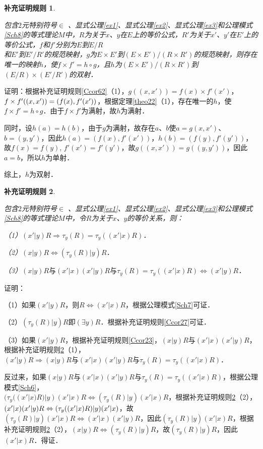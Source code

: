 \documentclass[12pt, a4paper, oneside]{book}
\newtheorem{Ccor}{补充证明规则}
\begin{document}
			\begin{Ccor}\label{Ccor64}
				\hfill\par
				包含$2$元特别符号$\in$ 、显式公理\ref{ex1}、显式公理\ref{ex2}、显式公理\ref{ex3}和公理模式\ref{Sch8}的等式理论$M$中，$R$为关于$x$、$y$在$E$上的等价公式，$R'$为关于$x'$、$y'$在$E'$上的等价公式，$f$和$f'$分别为$E$到$E/R$\\和$E'$到$E'/R'$的规范映射，$g$为$E\times E'$到$(E\times E')/(R\times R')$的规范映射，则存在唯一的映射$h$，使$f\times f'=h\circ g$，且$h$为$(E\times E')/(R\times R')$到$(E/R)\times (E'/R')$的双射．
			\end{Ccor}
			证明：根据补充证明规则\ref{Ccor62}（1），$g((x, x'))=f(x)\times f'(x')$，$f\times f'((x, x'))=\\(f(x), f'(x'))$，根据定理\ref{theo22}（1），存在唯一的$h$，使$f\times f'=h\circ g$．由于$f\times f'$为满射，故$h$为满射．
			\par
			同时，设$h(a)=h(b)$，由于$g$为满射，故存在$a$、$b$使$a=g(x, x')$、$b=(y, y')$，因此$h(a)= (f(x), f'(x'))$，$h(b)=(f(y), f'(y'))$，故$f(x)=f(y)$, $f'(x')=f'(y')$，故$g((x, x'))=g((y, y'))$，因此$a=b$，所以$h$为单射．
			\par
			综上，$h$为双射．
			
			
			\begin{Ccor}\label{Ccor65}
				\hfill\par
				包含$2$元特别符号$\in$ 、显式公理\ref{ex1}、显式公理\ref{ex2}、显式公理\ref{ex3}和公理模式\ref{Sch8}的等式理论$M$中，令$R$为关于$x$、$y$的等价关系，则：
				\par
				（1）$(x'|y)R\Rightarrow \tau_y(R)=\tau_y((x'|x)R)$．
				\par
				（2）$(x|y)R\Leftrightarrow (\tau_y(R)|y)R$．
				\par
				（3）$(x|y)R\text{与}(x'|x)(x'|y)R\text{与}\tau_y(R)=\tau_y((x'|x)R)\Leftrightarrow (x'|y)R$．
			\end{Ccor}
			证明：
			\par
			（1）如果$(x'|y)R$，则$R\Leftrightarrow (x'|x)R$，根据公理模式\ref{Sch7}可证．
			\par
			（2）$(\tau_y(R)|y)R$即$(\exists y)R$．根据补充证明规则\ref{Ccor27}可证．
			\par
			（3）如果$(x'|y)R$，根据补充证明规则\ref{Ccor23}，$(x|y)R\text{与}(x'|x)(x'|y)R$，根据补充证明规则\ref{Ccor65}（1），$(x'|y)R\Rightarrow (x|y)R\text{与}(x'|x)(x'|y)R\text{与}\tau_y(R)=\tau_y((x'|x)R)$．
			\par
			反过来，如果$(x|y)R\text{与}(x'|x)(x'|y)R\text{与}\tau_y(R)=\tau_y((x'|x)R)$，根据公理模式\ref{Sch6}，\\$(\tau_y((x'|x)R)|y)(x'|x)R\Leftrightarrow (\tau_y(R)|y)(x'|x)R$，根据补充证明规则\ref{Ccor65}（2），$(x'|x)(x'|y)R \Leftrightarrow\\ (\tau_y((x'|x)R)|y)(x'|x)$，故$(\tau_y(R)|y)(x'|x)R\Leftrightarrow (x'|x)(x'|y)R$，因此$(\tau_y(R)|y)(x'|x)R$，根据补充证明规则\ref{Ccor65}（2），$(x|y)R\Leftrightarrow (\tau_y(R)|y)R$，故$(\tau_y(R)|y)R$，因此$(x'|x)R$．得证．
\end{document}

